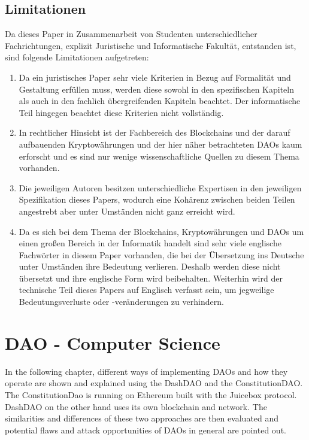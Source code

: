 \documentclass[a4paper,12pt]{report}
\begin{document}
	\section{Limitationen}
	\startsection
	    Da dieses Paper in Zusammenarbeit von Studenten unterschiedlicher Fachrichtungen, explizit Juristische und Informatische Fakultät, entstanden ist, sind folgende Limitationen aufgetreten:
	    \begin{enumerate}
	        \item Da ein juristisches Paper sehr viele Kriterien in Bezug auf Formalität und Gestaltung erfüllen muss, werden diese sowohl in den spezifischen Kapiteln als auch in den fachlich übergreifenden Kapiteln beachtet. Der informatische Teil hingegen beachtet diese Kriterien nicht vollständig.
	        \item In rechtlicher Hinsicht ist der Fachbereich des Blockchains und der darauf aufbauenden Kryptowährungen und der hier näher betrachteten DAOs kaum erforscht und es sind nur wenige wissenschaftliche Quellen zu diesem Thema vorhanden.
	        \item Die jeweiligen Autoren besitzen unterschiedliche Expertisen in den jeweiligen Spezifikation dieses Papers, wodurch eine Kohärenz zwischen beiden Teilen angestrebt aber unter Umständen nicht ganz erreicht wird.
	        \item Da es sich bei dem Thema der Blockchains, Kryptowährungen und DAOs um einen großen Bereich in der Informatik handelt sind sehr viele englische Fachwörter in diesem Paper vorhanden, die bei der Übersetzung ins Deutsche unter Umständen ihre Bedeutung verlieren. Deshalb werden diese nicht übersetzt und ihre englische Form wird beibehalten. Weiterhin wird der technische Teil dieses Papers auf Englisch verfasst sein, um jegweilige Bedeutungsverluste oder -veränderungen zu verhindern.
	    \end{enumerate}
	\closesection
	
	
	\chapter[DAO - CS]{DAO - Computer Science}
	In the following chapter, different ways of implementing DAOs and how they operate are shown and explained using the DashDAO and the ConstitutionDAO. The ConstitutionDao is running on Ethereum built with the Juicebox protocol. DashDAO on the other hand uses its own blockchain and network. The similarities and differences of these two approaches are then evaluated and potential flaws and attack opportunities of DAOs in general are pointed out.
	
\end{document}
